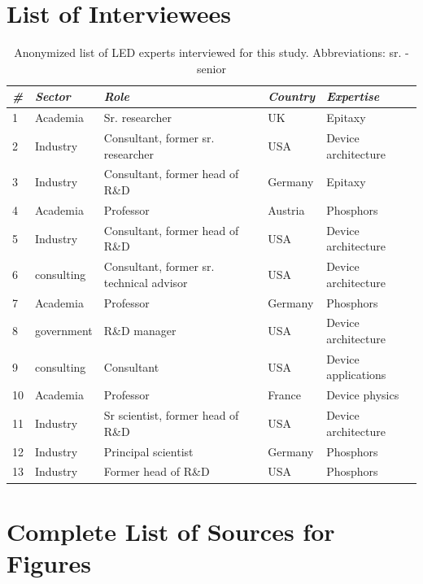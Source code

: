 \documentclass[10pt]{article}
\begin{document}
\begin{figure}[H]
\label{fig:phosphor_spectrum}
\end{figure}

\section{List of Interviewees}

\begin{table}[h!]
\small
    \centering
    \begin{tabular}{|l|l|l|l|l|}
    \hline
        \textit{\#} & \textit{Sector} & \textit{Role} & \textit{Country} & \textit{Expertise} \\ \hline
        1 & Academia & Sr. researcher & UK & Epitaxy \\ \hline
        2 & Industry & Consultant, former sr. researcher & USA & Device architecture \\ \hline
        3 & Industry & Consultant, former head of R\&D & Germany & Epitaxy \\ \hline
        4 & Academia & Professor & Austria & Phosphors \\ \hline
        5 & Industry & Consultant, former head of R\&D & USA & Device architecture \\ \hline
        6 & consulting & Consultant, former sr. technical advisor & USA & Device architecture \\ \hline
        7 & Academia & Professor & Germany & Phosphors \\ \hline
        8 & government & R\&D manager & USA & Device architecture \\ \hline
        9 & consulting & Consultant & USA & Device applications \\ \hline
        10 & Academia & Professor & France & Device physics \\ \hline
        11 & Industry & Sr scientist, former head of R\&D & USA & Device architecture \\ \hline
        12 & Industry & Principal scientist & Germany & Phosphors \\ \hline
        13 & Industry & Former head of R\&D & USA & Phosphors \\ \hline
    \end{tabular}
    \label{tab:interviews}
    \caption{Anonymized list of LED experts interviewed for this study. Abbreviations: sr. - senior}
\end{table}

\clearpage
\newpage
\section{Complete List of Sources for Figures}
\label{sec:sources}
\end{document}
